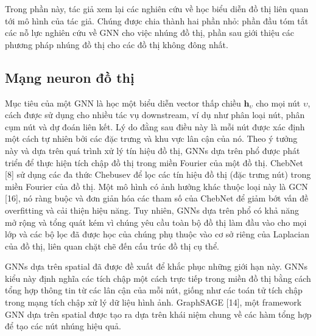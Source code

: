 Trong phần này, tác giả xem lại các nghiên cứu về học biểu diễn đồ thị liên quan tới mô hình của tác giả. Chúng được chia thành hai phần nhỏ: phần đầu tóm tắt các nỗ lực nghiên cứu về GNN cho việc nhúng đồ thị, phần sau giới thiệu các phương pháp nhúng đồ thị cho các đồ thị không đông nhất.

\subsection{Mạng neuron đồ thị}
Mục tiêu của một GNN là học một biểu diễn vector thấp chiều $\pmb{h}_{\upsilon}$ cho mọi nút $\upsilon$, cách được sử dụng cho nhiều tác vụ downstream, ví dụ như phân loại nút, phân cụm nút và dự đoán liên kết. Lý do đằng sau điều này là mỗi nút được xác định một cách tự nhiên bởi các đặc trưng và khu vực lân cận của nó. Theo ý tưởng này và dựa trên quá trình xử lý tín hiệu đồ thị, GNNs dựa trên phổ được phát triển để thực hiện tích chập đồ thị trong miền Fourier của một đồ thị. ChebNet [8] sử dụng các đa thức Chebusev để lọc các tín hiệu đồ thị (đặc trưng nút) trong miền Fourier của đồ thị. Một mô hình có ảnh hưởng khác thuộc loại này là GCN [16], nó ràng buộc và đơn giản hóa các tham số của ChebNet để giảm bớt vấn đề overfitting và cải thiện hiệu năng. Tuy nhiên, GNNs dựa trên phổ có khả năng mở rộng và tổng quát kém vì chúng yêu cầu toàn bộ đồ thị làm đầu vào cho mọi lớp và các bộ lọc đã được học của chúng phụ thuộc vào cơ sở riêng của Laplacian của đồ thị, liên quan chặt chẽ đến cấu trúc đồ thị cụ thể.

GNNs dựa trên spatial đã được đề xuất để khắc phục những giới hạn này. GNNs kiểu này định nghĩa các tích chập một cách trực tiếp trong miền đồ thị bằng cách tổng hợp thông tin từ các lân cận của mỗi nút, giống như các toán tử tích chập trong mạng tích chập xử lý dữ liệu hình ảnh. GraphSAGE [14], một framework GNN dựa trên spatial được tạo ra dựa trên khái niệm chung về các hàm tổng hợp để tạo các nút nhúng hiệu quả.